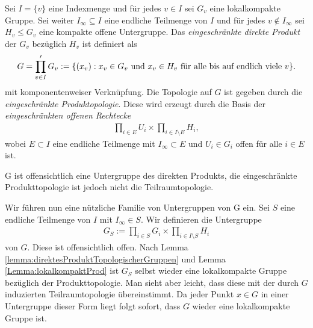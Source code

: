 		\begin{defi}
			Sei $I=\{v\}$ eine Indexmenge und für jedes $v \in I$ sei $G_v$ eine lokalkompakte Gruppe. 
			Sei weiter $I_\infty \subseteq I$ eine endliche Teilmenge von $I$ und für jedes $v \notin I_\infty$ sei $H_v\leq G_v$ eine kompakte offene Untergruppe. 
			Das \emph{eingeschränkte direkte Produkt} der $G_v$ bezüglich $H_v$ ist definiert als 
			\begin{align*}
				G = \prod\limits_{v \in I}' G_v := \{ (x_v): x_v \in G_v \text{ und } x_v \in H_v \text{ für alle bis auf endlich viele } v \}.
			\end{align*}
			mit komponentenweiser Verknüpfung. Die Topologie auf $G$ ist gegeben durch die \emph{eingeschränkte Produktopologie}. Diese wird erzeugt durch die Basis der \emph{eingeschränkten offenen Rechtecke}
			\begin{align*}
				\prod_{i \in E} U_i \times \prod_{i \in I\setminus E} H_i,
			\end{align*}
			wobei $E \subset I$ eine endliche Teilmenge mit $I_\infty \subset E$ und $U_i \in G_i$ offen für alle $i \in E$ ist.
		\end{defi}
		G ist offensichtlich eine Untergruppe des direkten Produkts, die eingeschränkte Produkttopologie ist jedoch nicht die Teilraumtopologie.
		
		Wir führen nun eine nützliche Familie von Untergruppen von G ein. Sei $S$ eine endliche Teilmenge von $I$ mit $I_\infty \in S$. Wir definieren die Untergruppe
		\begin{align*}
			G_S := \prod_{i \in S}G_i \times \prod_{i \in I\setminus S} H_i
		\end{align*}
		von $G$. Diese ist offensichtlich offen. Nach Lemma \ref{lemma:direktesProduktTopologischerGruppen} und Lemma \ref{Lemma:lokalkompaktProd} ist $G_S$ selbst wieder eine lokalkompakte Gruppe bezüglich der Produkttopologie. Man sieht aber leicht, dass diese mit der durch $G$ induzierten Teilraumtopologie übereinstimmt. Da jeder Punkt $x \in G$ in einer Untergruppe dieser Form liegt folgt sofort, dass $G$ wieder eine lokalkompakte Gruppe ist.
		
